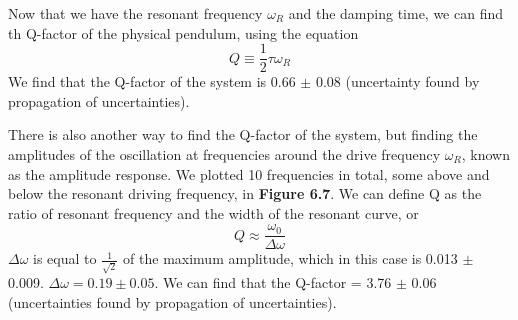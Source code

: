 \documentclass[11pt]{report}
\begin{document}
Now that we have the resonant frequency \(\omega_R\) and the damping time, we
can find th Q-factor of the physical pendulum, using the equation \[Q \equiv
\frac{1}{2}\tau\omega_R\]  We find that the Q-factor of the system is 0.66
$\pm$ 0.08 (uncertainty found by propagation of uncertainties).  


There is also another way to find the Q-factor of the system, but finding the
amplitudes of the oscillation at frequencies around the drive frequency
$\omega_R$, known as the amplitude response.  
We plotted 10 frequencies in total, some above and below the
resonant driving frequency, in \textbf{Figure 6.7}.  
We can define Q as the ratio of resonant frequency and the width of the
resonant curve, or \[Q \approx \frac{\omega_0}{\Delta\omega}\] $\Delta\omega$
is equal to $\frac{1}{\sqrt{2}}$ of the maximum amplitude, which in this case is
0.013 $\pm$ 0.009. $\Delta\omega = 0.19 \pm 0.05$.
We can find that the Q-factor = 3.76 $\pm$ 0.06 (uncertainties found by
propagation of uncertainties).
\end{document}
